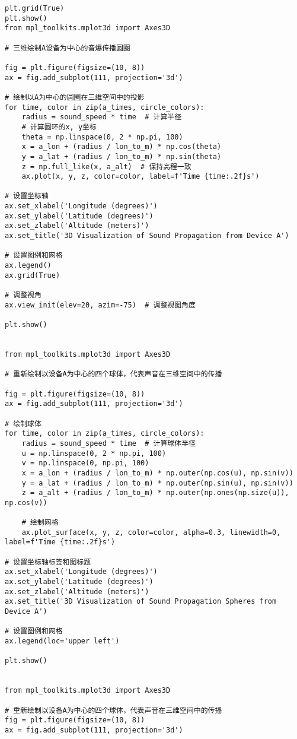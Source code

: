 \documentclass[withoutpreface,bwprint,12pt,a4paper]{cumcmthesis}
\begin{document}
\begin{appendices}
\begin{lstlisting}
plt.grid(True)
plt.show()
from mpl_toolkits.mplot3d import Axes3D

# 三维绘制A设备为中心的音爆传播圆圈

fig = plt.figure(figsize=(10, 8))
ax = fig.add_subplot(111, projection='3d')

# 绘制以A为中心的圆圈在三维空间中的投影
for time, color in zip(a_times, circle_colors):
    radius = sound_speed * time  # 计算半径
    # 计算圆环的x, y坐标
    theta = np.linspace(0, 2 * np.pi, 100)
    x = a_lon + (radius / lon_to_m) * np.cos(theta)
    y = a_lat + (radius / lon_to_m) * np.sin(theta)
    z = np.full_like(x, a_alt)  # 保持高程一致
    ax.plot(x, y, z, color=color, label=f'Time {time:.2f}s')

# 设置坐标轴
ax.set_xlabel('Longitude (degrees)')
ax.set_ylabel('Latitude (degrees)')
ax.set_zlabel('Altitude (meters)')
ax.set_title('3D Visualization of Sound Propagation from Device A')

# 设置图例和网格
ax.legend()
ax.grid(True)

# 调整视角
ax.view_init(elev=20, azim=-75)  # 调整视图角度

plt.show()


from mpl_toolkits.mplot3d import Axes3D

# 重新绘制以设备A为中心的四个球体，代表声音在三维空间中的传播

fig = plt.figure(figsize=(10, 8))
ax = fig.add_subplot(111, projection='3d')

# 绘制球体
for time, color in zip(a_times, circle_colors):
    radius = sound_speed * time  # 计算球体半径
    u = np.linspace(0, 2 * np.pi, 100)
    v = np.linspace(0, np.pi, 100)
    x = a_lon + (radius / lon_to_m) * np.outer(np.cos(u), np.sin(v))
    y = a_lat + (radius / lon_to_m) * np.outer(np.sin(u), np.sin(v))
    z = a_alt + (radius / lon_to_m) * np.outer(np.ones(np.size(u)), np.cos(v))

    # 绘制网格
    ax.plot_surface(x, y, z, color=color, alpha=0.3, linewidth=0, label=f'Time {time:.2f}s')

# 设置坐标轴标签和图标题
ax.set_xlabel('Longitude (degrees)')
ax.set_ylabel('Latitude (degrees)')
ax.set_zlabel('Altitude (meters)')
ax.set_title('3D Visualization of Sound Propagation Spheres from Device A')

# 设置图例和网格
ax.legend(loc='upper left')

plt.show()


from mpl_toolkits.mplot3d import Axes3D

# 重新绘制以设备A为中心的四个球体，代表声音在三维空间中的传播
fig = plt.figure(figsize=(10, 8))
ax = fig.add_subplot(111, projection='3d')


\end{lstlisting}
\end{appendices}
\end{document}
